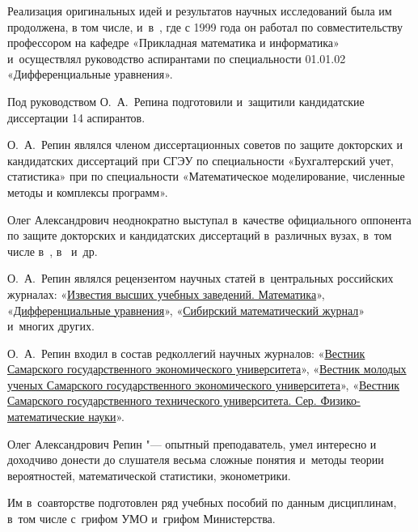 Реализация оригинальных идей и результатов научных исследований была им продолжена, в том числе, и~в~, где с 1999 года он работал по совместительству профессором на кафедре «Прикладная математика и информатика» и~осуществлял руководство аспирантами по специальности 01.01.02 «Дифференциальные уравнения».



Под руководством О.~А.~Репина  подготовили и~защитили кандидатские диссертации 14 аспирантов.



О.~А.~Репин являлся членом диссертационных советов по защите докторских и кандидатских диссертаций при СГЭУ по специальности «Бухгалтерский учет, статистика» при  по специальности «Математическое моделирование, численные методы и комплексы программ». 

Олег Александрович  неоднократно выступал в~качестве официального оппонента по защите докторских и кандидатских диссертаций в~различных вузах, в~том числе в~, в~ и~др. 

О.~А.~Репин являлся рецензентом научных статей в~центральных российских журналах: «\href{www.mathnet.ru/ivm}{Известия высших учебных заведений. Математика}», «\href{http://www.mathnet.ru/de}{Дифференциальные уравнения}», «\href{www.mathnet.ru/smj}{Сибирский математический журнал}» и~многих других.



О.~А.~Репин входил в состав редколлегий научных журналов: «\href{https://elibrary.ru/title_about.asp?id=8550}{Вестник Самарского государственного экономического университета}», «\href{https://elibrary.ru/title_about.asp?id=51034}{Вестник молодых ученых Самарского государственного экономического университета}»,  «\href{http://www.mathnet.ru/vsgtu}{Вестник Самарского государственного технического университета. Сер. Фи\-зи\-ко-математические науки}». 



Олег Александрович Репин "--- опытный преподаватель, умел интересно и доходчиво донести до слушателя весьма сложные понятия и~методы теории вероятностей, математической статистики, эконометрики. 

Им в~соавторстве подготовлен ряд учебных пособий по данным дисциплинам, в~том числе с~грифом УМО и~грифом Министерства. 

